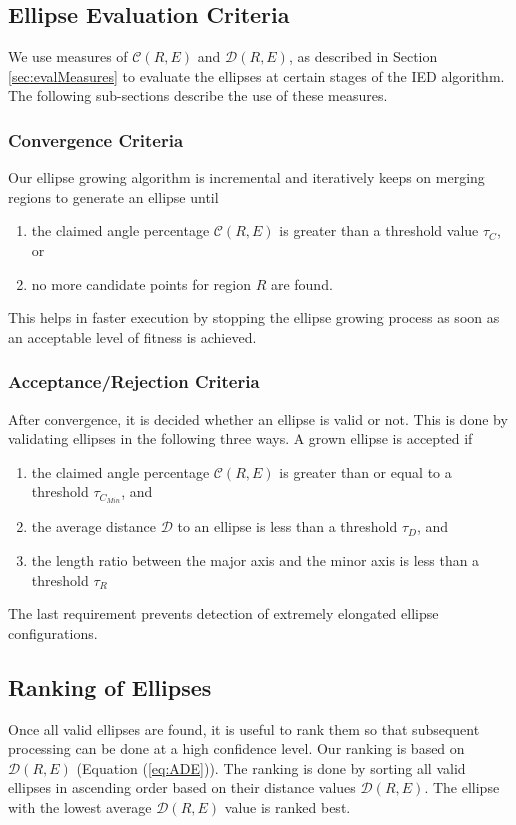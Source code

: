 \documentclass[preprint]{iucr}              %
\begin{document}
\subsection{Ellipse Evaluation Criteria}  \label{sec:evalCriteria}
We use measures of $\mathcal{C}(R,E)$ and $\mathcal{D}(R,E)$, as described in
Section \ref{sec:evalMeasures} to evaluate the ellipses at certain stages of the
IED algorithm.  
The following sub-sections describe the use of these measures.
\subsubsection{Convergence Criteria}
Our ellipse growing algorithm is incremental and iteratively keeps on merging
regions to generate an ellipse until 
\begin{enumerate}
    \item the claimed angle percentage $\mathcal{C}(R,E)$ is greater than a
    threshold value ${\tau}_C$, or 
    \item no more candidate points for region $R$ are found.
\end{enumerate}

This helps in faster execution by stopping the ellipse growing process as soon
as an acceptable level of fitness is achieved. 

\subsubsection{Acceptance/Rejection Criteria}
After convergence, it is decided whether an ellipse is valid or not.
This is done by validating ellipses in the following three ways.
A grown ellipse is accepted if
\begin{enumerate}
    \item the claimed angle percentage $\mathcal{C}(R,E)$ is greater than or
    equal to a threshold ${\tau}_{C_{Min}}$, and 
    \item the average distance $\mathcal{D}$ to an ellipse is less than a
    threshold ${\tau}_D$, and 
    \item the length ratio between the major axis and the minor axis is less
    than a threshold ${\tau}_R$ 
\end{enumerate}

The last requirement prevents detection of extremely elongated ellipse
configurations. 

\subsection{Ranking of Ellipses}
Once all valid ellipses are found, it is useful to rank them so that subsequent
processing can be done at a high confidence level. 
Our ranking is based on $\mathcal{D}(R,E)$ (Equation (\ref{eq:ADE})).
The ranking is done by sorting all valid ellipses in ascending order based on
their distance values $\mathcal{D}(R,E)$. 
The ellipse with the lowest average $\mathcal{D}(R,E)$ value is ranked best. 
\end{document}
